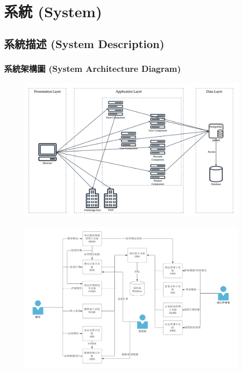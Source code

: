 \documentclass[a4paper, 12pt]{article}
\begin{document}
\newpage

\section{系統 (System)}
\subsection{系統描述 (System Description)}
\subsubsection{系統架構圖 (System Architecture Diagram) }

\begin{figure}[h]
    \centering
    \includegraphics[width=31em]{System-Architecture-Diagram.png}
    \label{fig:enter-label}
\end{figure}

\begin{figure}[h]
    \centering
    \includegraphics[width=30em]{System-Architecture-Diagram2.png}
    \label{fig:enter-label}
\end{figure}
\newpage
\end{document}
